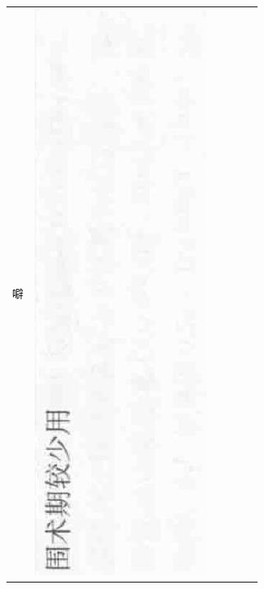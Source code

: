 \documentclass[10pt]{article}
\begin{document}
\begin{center}
\begin{tabular}{|c|c|c|c|c|c|}
噼 & \includegraphics[max width=\textwidth]{2024_07_05_645bb794a4d4f32ee0c8g-352(6)}

\end{tabular}
\end{center}
\end{document}
